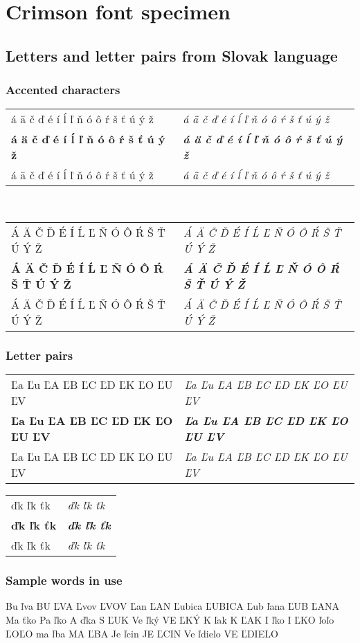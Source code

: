 ﻿\documentclass[12pt,a4paper,twoside]{article}
\makeatletter
\def\kernpairsLcaron{Ľa Ľu ĽA ĽB ĽC ĽD ĽK ĽO ĽU ĽV}
\def\kernpairsdltcaron{ďk ľk ťk}
\def\slovakaccentedalpha{á ä č ď é í ĺ ľ ň ó ô ŕ š ť ú ý ž}
\def\slovakaccentedAlpha{Á Ä Č Ď É Í Ĺ Ľ Ň Ó Ô Ŕ Š Ť Ú Ý Ž}
\newcommand\testallweights[1]{\begin{tabular}{@{}l@{\enskip}l@{}}
#1 & \textit{#1}\\
\textbf{#1} & \textit{\textbf{#1}}\\
{\crimsonbold #1} & {\crimsonbold\textit{#1}}
\end{tabular}}
\newcommand{\red}[1]{{\color{red} #1}}
\makeatother
\begin{document}
\section{Crimson font specimen}
\subsection{Letters and letter pairs from Slovak language}
\subsubsection{Accented characters}
\begin{slovak}
\testallweights{\slovakaccentedalpha}\\
\testallweights{\slovakaccentedAlpha}
\subsubsection{Letter pairs}
\testallweights{\kernpairsLcaron}
\testallweights{\kernpairsdltcaron}
\subsubsection{Sample words in use}
Bu\red{ľv}a BU\red{ĽV}A \red{Ľv}ov \red{ĽV}OV \red{Ľa}n \red{ĽA}N \red{Ľu}bica \red{ĽU}BICA \red{Ľu}b\red{ľa}na \red{ĽU}B\red{ĽA}NA Ma\red{ťk}o Pa\red{ľk}o A\red{ďk}a S\red{ĽU}K Ve\red{ľk}ý VE\red{ĽK}Ý K\red{ľa}k K\red{ĽA}K I\red{ľk}o I\red{ĽK}O \red{ľo}ľo \red{ĽO}ĽO ma\red{ľb}a MA\red{ĽB}A Je\red{ľc}in JE\red{ĽC}IN Ve\red{ľd}ielo VE\red{ĽD}IELO
\end{slovak}
\end{document}
